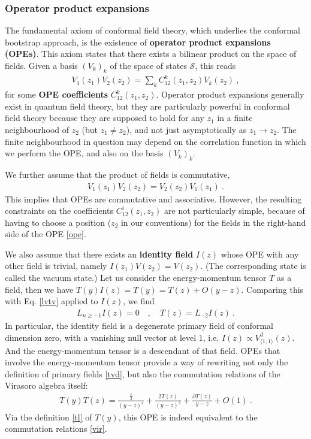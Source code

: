 \documentclass[12pt, a4paper]{article}
\theoremstyle{break}
\begin{document}
\subsubsection{Operator product expansions}\label{sec:ope}

The fundamental axiom of conformal field theory, which underlies the conformal bootstrap approach, is the existence of \textbf{operator product expansions (OPEs)}. This axiom states that there exists a bilinear product on the space of fields. Given a basis $(V_k)_k$ of the space of states $\mathcal{S}$, this reads 
\begin{align}
  \boxed{V_1(z_1)V_2(z_2) = \sum_k C^k_{12}(z_1,z_2) V_k(z_2)}\ ,
  \label{ope}
 \end{align}
for some \textbf{OPE coefficients} $C^k_{12}(z_1,z_2)$. Operator product expansions generally exist in quantum field theory, but they are particularly powerful in conformal field theory because they are supposed to hold for any $z_1$ in a finite neighbourhood of $z_2$ (but $z_1\neq z_2$), and not just asymptotically as $z_1\to z_2$. The finite neighbourhood in question may depend on the correlation function in which we perform the OPE, and also on the basis $(V_k)_k$. 

We further assume that the product of fields is commutative,
\begin{align}
 \boxed{V_1(z_1)V_2(z_2) = V_2(z_2)V_1(z_1)}\ .
 \label{comm}
\end{align}
This implies that OPEs are commutative and associative. However, the resulting constraints on the coefficients $C^i_{12}(z_1,z_2)$ are not particularly simple, because of having to choose a position ($z_2$ in our conventions) for the fields in the right-hand side of the OPE \eqref{ope}. 

We also assume that there exists an \textbf{identity field} $I(z)$ whose OPE with any other field is trivial, namely $I(z_1)V(z_2) = V(z_2)$. (The corresponding state is called the vacuum state.) Let us consider the energy-momentum tensor $T$ as a field, then we have 
$
 T(y)I(z) = T(y) = T(z)  + O(y-z)
$. 
Comparing this with Eq. \eqref{lvtv} applied to $I(z)$, we find 
\begin{align}
 L_{n\geq -1} I(z) = 0 \quad , \quad T(z) = L_{-2}I(z)\ .
\end{align}
In particular, the identity field is a degenerate primary field of conformal dimension zero, with a vanishing null vector at level $1$, i.e. $I(z) \propto V^d_{\langle 1,1\rangle}(z)$. And the energy-momentum tensor is a descendant of that field.
OPEs that involve the energy-momentum tensor provide a way of rewriting not only the definition of primary fields \eqref{tvd}, but also the commutation relations of the Virasoro algebra itself: 
\begin{align}
 T(y)T(z) = \frac{\frac{c}{2}}{(y-z)^4} + \frac{2T(z)}{(y-z)^2} + \frac{\partial T(z)}{y-z} + O(1)\ .
\label{tt}
\end{align}
Via the definition \eqref{tl} of $T(y)$, this OPE is indeed equivalent to the commutation relations \eqref{vir}.
\end{document}
